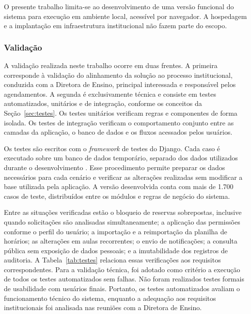 \documentclass[
	12pt,				%
	twoside,			%
	openany,			%
	a4paper,			%
	chapter=TITLE,		%
	section=TITLE,		%
	subsection=TITLE,	%
	subsubsection=TITLE,%
	english,			%
	french,				%
	spanish,			%
	brazil,				%
	]{abntex2}
\begin{document}
O presente trabalho limita-se ao desenvolvimento de uma versão funcional do sistema para execução em ambiente local, acessível por navegador. A hospedagem e a implantação em infraestrutura institucional não fazem parte do escopo.
\subsubsection{Validação}
\label{sec:validacao}

A validação realizada neste trabalho ocorre em duas frentes. A primeira corresponde à validação do alinhamento da solução ao processo institucional, conduzida com a Diretora de Ensino, principal interessada e responsável pelos agendamentos. A segunda é exclusivamente técnica e consiste em testes automatizados, unitários e de integração, conforme os conceitos da Seção~\ref{sec:testes}. Os testes unitários verificam regras e componentes de forma isolada. Os testes de integração verificam o comportamento conjunto entre as camadas da aplicação, o banco de dados e os fluxos acessados pelos usuários.

Os testes são escritos com o \textit{framework} de testes do Django. Cada caso é executado sobre um banco de dados temporário, separado dos dados utilizados durante o desenvolvimento \cite{djangodocs}. Esse procedimento permite preparar os dados necessários para cada cenário e verificar as alterações realizadas sem modificar a base utilizada pela aplicação. A versão desenvolvida conta com mais de 1.700 casos de teste, distribuídos entre os módulos e regras de negócio do sistema.

Entre as situações verificadas estão o bloqueio de reservas sobrepostas, inclusive quando solicitações são analisadas simultaneamente; a aplicação das permissões conforme o perfil do usuário; a importação e a reimportação da planilha de horários; as alterações em aulas recorrentes; o envio de notificações; a consulta pública sem exposição de dados pessoais; e a imutabilidade dos registros de auditoria. A Tabela~\ref{tab:testes} relaciona essas verificações aos requisitos correspondentes. Para a validação técnica, foi adotado como critério a execução de todos os testes automatizados sem falhas. Não foram realizados testes formais de usabilidade com usuários finais. Portanto, os testes automatizados avaliam o funcionamento técnico do sistema, enquanto a adequação aos requisitos institucionais foi analisada nas reuniões com a Diretora de Ensino.
\end{document}
